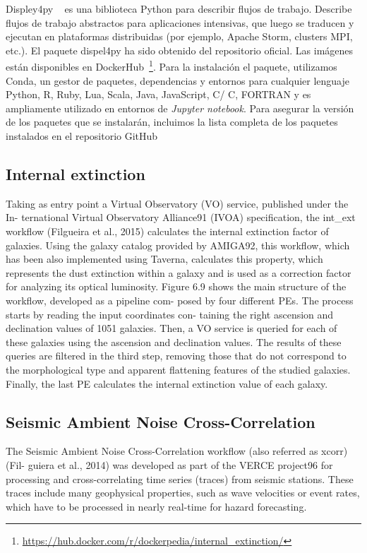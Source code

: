 Displey4py ~\cite{} es una biblioteca Python para describir flujos de trabajo. Describe flujos de trabajo abstractos para aplicaciones intensivas, que luego se traducen y ejecutan en plataformas distribuidas (por ejemplo, Apache Storm, clusters MPI, etc.).
El paquete dispel4py ha sido obtenido del repositorio oficial. Las imágenes están disponibles en DockerHub~\footnote{\url{https://hub.docker.com/r/dockerpedia/internal_extinction/}}. Para la instalación el paquete, utilizamos Conda, un gestor de paquetes, dependencias y entornos para cualquier lenguaje Python, R, Ruby,
Lua, Scala, Java, JavaScript, C/ C\+\+, FORTRAN y es ampliamente utilizado en entornos de \textit{Jupyter notebook}. Para asegurar la versión de los paquetes que se instalarán, incluimos la lista completa de los paquetes instalados en el repositorio GitHub

\subsection{Internal extinction}

Taking as entry point a Virtual Observatory (VO) service, published under the In- ternational Virtual Observatory Alliance91 (IVOA) specification, the int\_ext workflow (Filgueira et al., 2015) calculates the internal extinction factor of galaxies. Using the galaxy catalog provided by AMIGA92, this workflow, which has been also implemented using Taverna, calculates this property, which represents the dust extinction within a galaxy and is used as a correction factor for analyzing its optical luminosity.
Figure 6.9 shows the main structure of the workflow, developed as a pipeline com- posed by four different PEs. The process starts by reading the input coordinates con- taining the right ascension and declination values of 1051 galaxies. Then, a VO service is queried for each of these galaxies using the ascension and declination values. The results of these queries are filtered in the third step, removing those that do not correspond to the morphological type and apparent flattening features of the studied galaxies. Finally, the last PE calculates the internal extinction value of each galaxy.

\subsection{Seismic Ambient Noise Cross-Correlation}

The Seismic Ambient Noise Cross-Correlation workflow (also referred as xcorr) (Fil- guiera et al., 2014) was developed as part of the VERCE project96 for processing and cross-correlating time series (traces) from seismic stations. These traces include many geophysical properties, such as wave velocities or event rates, which have to be processed in nearly real-time for hazard forecasting.

